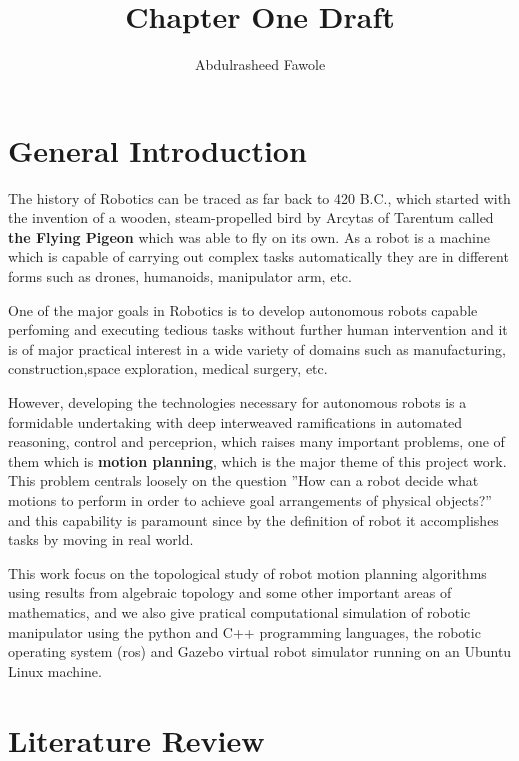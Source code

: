 \documentclass[a4paper, 12pt]{scrartcl}
\title{Chapter One Draft}
\author{Abdulrasheed Fawole}
\begin{document}
\baselineskip24pt
    \maketitle
    \section{General Introduction}
    The history of Robotics can be traced as far back to 420 B.C., which started with the invention of a wooden, steam-propelled bird by Arcytas of Tarentum called \textbf{the Flying Pigeon} which was able to fly on its own.
    As a robot is a machine which is capable of carrying out complex tasks automatically they are in different forms such as drones, humanoids, manipulator arm, etc.

    One of the major goals in Robotics is to develop autonomous robots capable perfoming and executing tedious tasks without further human intervention and it is of major practical interest in a wide variety of domains such as manufacturing, construction,space exploration, medical surgery, etc.

    However, developing the technologies necessary for autonomous robots is a formidable undertaking with deep interweaved ramifications in automated reasoning, control and perceprion, which raises many important problems, one of them which is \textbf{motion planning}, which is the major theme of this project work. This problem centrals loosely on the question ''How can a robot decide what motions to perform in order to achieve goal arrangements of physical objects?'' and this capability is paramount since by the definition of robot it accomplishes tasks by moving in real world.
    
    This work focus on the topological study of robot motion planning algorithms using results from algebraic topology and some other important areas of mathematics, and we also give pratical computational simulation of robotic manipulator using the python and C++ programming languages, the robotic operating system (ros) and Gazebo virtual robot simulator running on an Ubuntu Linux machine.
    
    \section{Literature Review}
    
    
    
    
    
    
    
    
    
    
    
    
    
    
    
    
    
    
\end{document}
